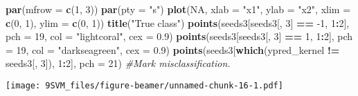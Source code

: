 \documentclass[10pt,ignorenonframetext,]{beamer}
\newenvironment{Shaded}{\begin{snugshade}}{\end{snugshade}}
\newcommand{\KeywordTok}[1]{\textcolor[rgb]{0.13,0.29,0.53}{\textbf{#1}}}
\newcommand{\DataTypeTok}[1]{\textcolor[rgb]{0.13,0.29,0.53}{#1}}
\newcommand{\DecValTok}[1]{\textcolor[rgb]{0.00,0.00,0.81}{#1}}
\newcommand{\FloatTok}[1]{\textcolor[rgb]{0.00,0.00,0.81}{#1}}
\newcommand{\StringTok}[1]{\textcolor[rgb]{0.31,0.60,0.02}{#1}}
\newcommand{\CommentTok}[1]{\textcolor[rgb]{0.56,0.35,0.01}{\textit{#1}}}
\newcommand{\OtherTok}[1]{\textcolor[rgb]{0.56,0.35,0.01}{#1}}
\newcommand{\OperatorTok}[1]{\textcolor[rgb]{0.81,0.36,0.00}{\textbf{#1}}}
\newcommand{\NormalTok}[1]{#1}
\begin{document}
\begin{frame}[fragile]

\begin{Shaded}
\begin{Highlighting}[]
\KeywordTok{par}\NormalTok{(}\DataTypeTok{mfrow =} \KeywordTok{c}\NormalTok{(}\DecValTok{1}\NormalTok{, }\DecValTok{3}\NormalTok{))}
\KeywordTok{par}\NormalTok{(}\DataTypeTok{pty =} \StringTok{"s"}\NormalTok{)}
\KeywordTok{plot}\NormalTok{(}\OtherTok{NA}\NormalTok{, }\DataTypeTok{xlab =} \StringTok{"x1"}\NormalTok{, }\DataTypeTok{ylab =} \StringTok{"x2"}\NormalTok{, }\DataTypeTok{xlim =} \KeywordTok{c}\NormalTok{(}\DecValTok{0}\NormalTok{, }\DecValTok{1}\NormalTok{), }\DataTypeTok{ylim =} \KeywordTok{c}\NormalTok{(}\DecValTok{0}\NormalTok{, }\DecValTok{1}\NormalTok{))}
\KeywordTok{title}\NormalTok{(}\StringTok{"True class"}\NormalTok{)}
\KeywordTok{points}\NormalTok{(seeds3[seeds3[, }\DecValTok{3}\NormalTok{] }\OperatorTok{==}\StringTok{ }\DecValTok{-1}\NormalTok{, }\DecValTok{1}\OperatorTok{:}\DecValTok{2}\NormalTok{], }\DataTypeTok{pch =} \DecValTok{19}\NormalTok{, }\DataTypeTok{col =} \StringTok{"lightcoral"}\NormalTok{, }
    \DataTypeTok{cex =} \FloatTok{0.9}\NormalTok{)}
\KeywordTok{points}\NormalTok{(seeds3[seeds3[, }\DecValTok{3}\NormalTok{] }\OperatorTok{==}\StringTok{ }\DecValTok{1}\NormalTok{, }\DecValTok{1}\OperatorTok{:}\DecValTok{2}\NormalTok{], }\DataTypeTok{pch =} \DecValTok{19}\NormalTok{, }\DataTypeTok{col =} \StringTok{"darkseagreen"}\NormalTok{, }
    \DataTypeTok{cex =} \FloatTok{0.9}\NormalTok{)}
\KeywordTok{points}\NormalTok{(seeds3[}\KeywordTok{which}\NormalTok{(ypred_kernel }\OperatorTok{!=}\StringTok{ }\NormalTok{seeds3[, }\DecValTok{3}\NormalTok{]), }\DecValTok{1}\OperatorTok{:}\DecValTok{2}\NormalTok{], }\DataTypeTok{pch =} \DecValTok{21}\NormalTok{)  }\CommentTok{#Mark misclassification.}
\end{Highlighting}
\end{Shaded}

\texttt{[image: 9SVM\_files/figure-beamer/unnamed-chunk-16-1.pdf]}

\end{frame}
\end{document}
